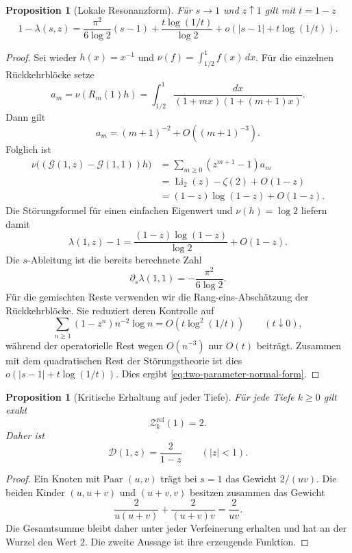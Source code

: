 \documentclass[11pt,a4paper]{article}
\newtheorem{proposition}[remark]{Proposition}
\begin{document}
\begin{proposition}[Lokale Resonanzform]
Für $s\to1$ und $z\uparrow1$ gilt mit $t=1-z$
\begin{equation}\label{eq:two-parameter-normal-form}
 1-\lambda(s,z)
 =
 \frac{\pi^2}{6\log2}(s-1)
 +
 \frac{t\log(1/t)}{\log2}
 +
 o\!\left(|s-1|+t\log(1/t)\right).
\end{equation}
\end{proposition}

\begin{proof}
Sei wieder $h(x)=x^{-1}$ und
$\nu(f)=\int_{1/2}^1f(x)\,dx$. Für die einzelnen Rückkehrblöcke setze
\[
 a_m=\nu(R_m(1)h)
 =
 \int_{1/2}^1
 \frac{dx}{(1+mx)(1+(m+1)x)}.
\]
Dann gilt
\[
 a_m=(m+1)^{-2}+O\!\left((m+1)^{-3}\right).
\]
Folglich ist
\[
 \begin{aligned}
 \nu\bigl((\mathcal G(1,z)-\mathcal G(1,1))h\bigr)
 &=
 \sum_{m\ge0}(z^{m+1}-1)a_m\\
 &=
 \operatorname{Li}_2(z)-\zeta(2)+O(1-z)\\
 &=
 (1-z)\log(1-z)+O(1-z).
 \end{aligned}
\]
Die Störungsformel für einen einfachen Eigenwert und
$\nu(h)=\log2$ liefern damit
\[
 \lambda(1,z)-1
 =
 \frac{(1-z)\log(1-z)}{\log2}+O(1-z).
\]
Die $s$-Ableitung ist die bereits berechnete Zahl
\[
 \partial_s\lambda(1,1)=-\frac{\pi^2}{6\log2}.
\]
Für die gemischten Reste verwenden wir die Rang-eins-Abschätzung der
Rückkehrblöcke. Sie reduziert deren Kontrolle auf
\[
 \sum_{n\ge1}(1-z^n)n^{-2}\log n
 =
 O\!\left(t\log^2(1/t)\right)
 \qquad(t\downarrow0),
\]
während der operatorielle Rest wegen $O(n^{-3})$ nur $O(t)$ beiträgt.
Zusammen mit dem quadratischen Rest der Störungstheorie ist dies
$o(|s-1|+t\log(1/t))$. Dies ergibt
\eqref{eq:two-parameter-normal-form}.
\end{proof}

\begin{proposition}[Kritische Erhaltung auf jeder Tiefe]
Für jede Tiefe $k\ge0$ gilt exakt
\[
 \mathcal Z_k^{\mathrm{ref}}(1)=2.
\]
Daher ist
\[
 \mathscr D(1,z)=\frac2{1-z}
 \qquad(|z|<1).
\]
\end{proposition}

\begin{proof}
Ein Knoten mit Paar $(u,v)$ trägt bei $s=1$ das Gewicht $2/(uv)$.
Die beiden Kinder $(u,u+v)$ und $(u+v,v)$ besitzen zusammen das Gewicht
\[
 \frac2{u(u+v)}+\frac2{(u+v)v}
 =
 \frac2{uv}.
\]
Die Gesamtsumme bleibt daher unter jeder Verfeinerung erhalten und
hat an der Wurzel den Wert $2$. Die zweite Aussage ist ihre
erzeugende Funktion.
\end{proof}
\end{document}

